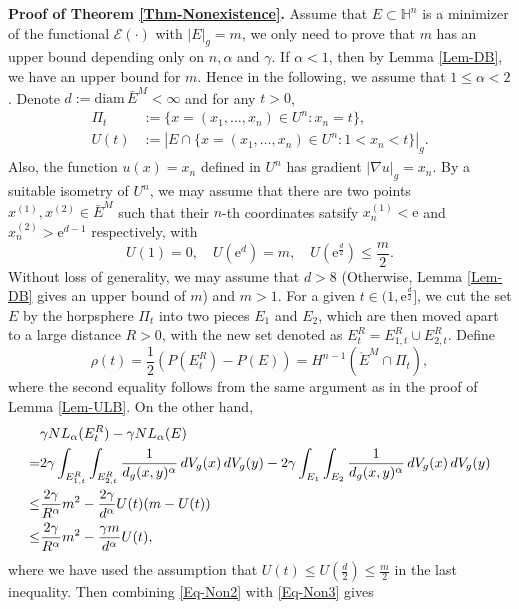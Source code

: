\documentclass[11pt,reqno]{amsart}
\theoremstyle{definition}
\theoremstyle{remark}
\numberwithin{equation}{section}
\renewcommand{\(}{\left(}
\renewcommand{\)}{\right)}
\renewcommand{\-}{\overline}
\begin{document}
{\noindent\bf{Proof of Theorem \ref{Thm-Nonexistence}.}} Assume that $E\subset\mathbb{H}^n$ is a minimizer of the functional $\mathcal{E}(\cdot)$ with $|E|_g=m$, we only need to prove that $m$ has an upper bound depending only on $n, \alpha$ and $\gamma$. If $\alpha<1$, then by Lemma \ref{Lem-DB}, we have an upper bound for $m$. Hence in the following, we assume that $1\leq\alpha<2$. Denote $d:=\mathrm{diam}\,\bar{E}^M<\infty$ and for any $t>0$,
\begin{align}
	\Pi_t&:=\{x=(x_1,\dots,x_n)\in U^n:x_n=t\},\label{Eq-Non0}\\
	U(t)&:=|E\cap\{x=(x_1,\dots,x_n)\in U^n: 1<x_n<t\}|_g. \label{Eq-Non}
\end{align}
Also, the function $u(x)=x_n$ defined in $U^n$ has gradient $|\nabla u|_g=x_n$. By a suitable isometry of $U^n$, we may assume that there are two points $x^{(1)}, x^{(2)}\in\bar{E}^M$ such that their $n$-th coordinates satsify $x^{(1)}_n< \mathrm{e}$ and $x^{(2)}_n>\mathrm{e}^{d-1}$ respectively, with
\begin{equation}\label{Eq-Non1}
   U(1)=0,\quad	 U(\mathrm{e}^d)=m,\quad U(\mathrm{e}^{\frac{d}{2}})\leq\frac{m}{2}.
\end{equation}
Without loss of generality, we may assume that $d>8$ (Otherwise, Lemma \ref{Lem-DB} gives an upper bound of $m$) and $m>1$. For a given $t\in(1,\mathrm{e}^{\frac{d}{2}}]$, we cut the set $E$ by the horpsphere $\Pi_t$ into two pieces $E_1$ and $E_2$, which are then moved apart to a large distance $R>0$, with the new set denoted as $E_t^R=E_{1,t}^R\cup E_{2,t}^R$.
Define
\begin{equation}\label{Eq-Non2}
	\rho(t)=\frac{1}{2}\left(P(E_t^R)-P(E)\right)=H^{n-1}(\mathring{E}^M\cap\Pi_t),
\end{equation}
where the second equality follows from the same argument as in the proof of Lemma \ref{Lem-ULB}. On the other hand,
\begin{align}
	&\gamma NL_{\alpha}(E_t^R)-\gamma NL_{\alpha}(E)\notag\\
	=&2\gamma\int_{E_{1,t}^R}\int_{E_{2,t}^R}{\frac{1}{d_g(x,y)^{\alpha}}}\,dV_g(x)\,dV_g(y)-2\gamma\int_{E_1}\int_{E_2}{\frac{1}{d_g(x,y)^{\alpha}}}\,dV_g(x)\,dV_g(y)\notag\\
	\leq&\frac{2\gamma}{R^{\alpha}}m^2-\frac{2\gamma}{d^{\alpha}} U(t)(m-U(t))\notag\\
	\leq &\frac{2\gamma}{R^{\alpha}}m^2-\frac{\gamma m}{d^{\alpha}}U(t),\label{Eq-Non3}
\end{align}
where we have used the assumption that $U(t)\leq U(\frac{d}{2})\leq \frac{m}{2}$ in the last inequality. Then combining \eqref{Eq-Non2} with \eqref{Eq-Non3} gives
\end{document}
